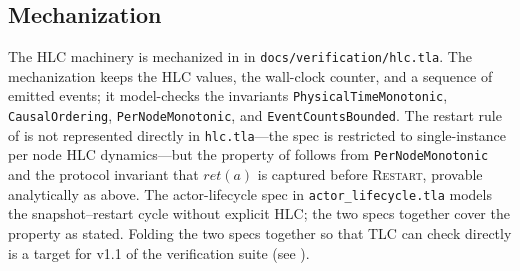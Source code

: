 \subsection{Mechanization}
\label{sec:supervision:mechanization}

The HLC machinery is mechanized in \TLA{} in
\texttt{docs/verification/hlc.tla}.  The mechanization keeps the
HLC values, the wall-clock counter, and a sequence of emitted
events; it model-checks the invariants \texttt{PhysicalTimeMonotonic},
\texttt{CausalOrdering}, \texttt{PerNodeMonotonic}, and
\texttt{EventCountsBounded}.  The restart rule of
 is not represented directly in
\texttt{hlc.tla}—the spec is restricted to single-instance per node
HLC dynamics—but the property of 
follows from \texttt{PerNodeMonotonic} and the protocol invariant
that \(\mathit{ret}(a)\) is captured before \textsc{Restart},
provable analytically as above.  The actor-lifecycle spec in
\texttt{actor\_lifecycle.tla} models the snapshot--restart cycle
without explicit HLC; the two specs together cover the property as
stated.  Folding the two specs together so that TLC can check
 directly is a target for v1.1 of
the verification suite (see ).
